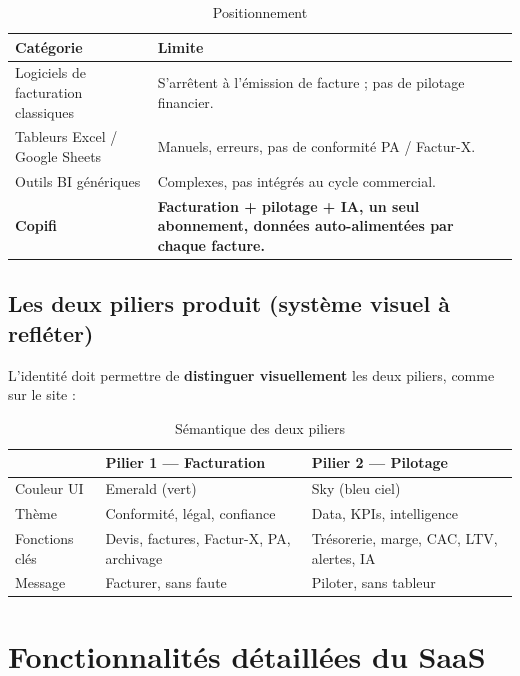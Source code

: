 \documentclass[11pt,a4paper]{report}
\begin{document}
\begin{table}[h]
\centering
\caption{Positionnement}
\begin{tabular}{@{}p{4.5cm}p{9.2cm}@{}}
\toprule
\textbf{Catégorie} & \textbf{Limite} \\
\midrule
Logiciels de facturation classiques & S'arrêtent à l'émission de facture ; pas de pilotage financier. \\
Tableurs Excel / Google Sheets & Manuels, erreurs, pas de conformité PA / Factur-X. \\
Outils BI génériques & Complexes, pas intégrés au cycle commercial. \\
\textbf{Copifi} & \textbf{Facturation + pilotage + IA, un seul abonnement, données auto-alimentées par chaque facture.} \\
\bottomrule
\end{tabular}
\end{table}

\section{Les deux piliers produit (système visuel à refléter)}

L'identité doit permettre de \textbf{distinguer visuellement} les deux piliers, comme sur le site :

\begin{table}[h]
\centering
\caption{Sémantique des deux piliers}
\begin{tabular}{@{}p{2.8cm}p{5.5cm}p{5.5cm}@{}}
\toprule
 & \textbf{Pilier 1 — Facturation} & \textbf{Pilier 2 — Pilotage} \\
\midrule
Couleur UI & Emerald (vert) & Sky (bleu ciel) \\
Thème & Conformité, légal, confiance & Data, KPIs, intelligence \\
Fonctions clés & Devis, factures, Factur-X, PA, archivage & Trésorerie, marge, CAC, LTV, alertes, IA \\
Message & Facturer, sans faute & Piloter, sans tableur \\
\bottomrule
\end{tabular}
\end{table}

\chapter{Fonctionnalités détaillées du SaaS}
\end{document}
